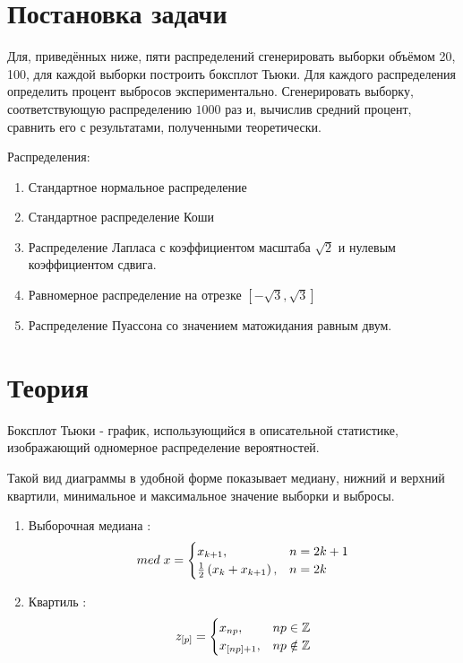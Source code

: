 \documentclass[a4]{article}
\renewcommand{\listoffigures}{\begingroup %
\tocsection
\tocfile{\listfigurename}{lof}
\endgroup}
\renewcommand{\listoftables}{\begingroup %
\tocsection
\tocfile{\listtablename}{lot}
\endgroup}
\begin{document}



\newpage
\tableofcontents{}
\newpage
\listoffigures{}
\listoftables{}
\newpage

\section{Постановка задачи}

Для, приведённых ниже, пяти распределений сгенерировать выборки объёмом 20, 100, для каждой выборки построить боксплот Тьюки. Для каждого распределения определить процент выбросов экспериментально. Сгенерировать выборку, соответствующую распределению $1000$ раз и, вычислив средний процент, сравнить его с результатами, полученными теоретически.

Распределения:
\begin{enumerate}
\item Стандартное нормальное распределение
\item Стандартное распределение Коши
\item Распределение Лапласа с коэффициентом масштаба $\sqrt{2}$ и нулевым коэффициентом сдвига.
\item Равномерное распределение на отрезке $\left[-\sqrt{3}, \sqrt{3}\right]$
\item Распределение Пуассона со значением матожидания равным двум.
\end{enumerate}


\section{Теория}

Боксплот Тьюки - график, использующийся в описательной статистике, изображающий одномерное распределение вероятностей.

Такой вид диаграммы в удобной форме показывает медиану, нижний и верхний квартили, минимальное и максимальное значение выборки и выбросы.

\begin{enumerate}
\item Выборочная медиана \cite{med}:
\begin{equation}
med\; x = \begin{cases}
x_{k+1}, & n = 2k+1\\
\frac{1}{2}\left(x_k+x_{k+1}\right), & n = 2k
\end{cases} \hfill  \label{eqn:med}
\end{equation}

\item Квартиль \cite{quart}:
\begin{equation}
z_{[p]} = \begin{cases}
x_{np}, & np \in \mathbb{Z}\\
x_{[np]+1}, & np \notin \mathbb{Z}
\end{cases} \hfill  \label{eqn:quart}
\end{equation}
\end{enumerate}
\end{document}
